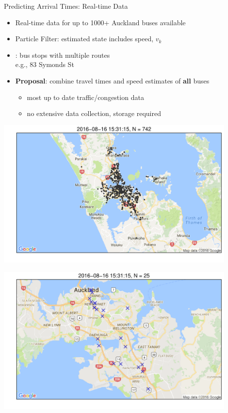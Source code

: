 \documentclass[10pt,t]{beamer}
\begin{document}
\begin{frame}{Predicting Arrival Times: Real-time Data}  
  \begin{itemize}[<+->]
  \item Real-time data for up to 1000+ Auckland buses available
  \item Particle Filter: estimated state includes speed, $v_k$
  \item \cite{yu-etal:2011}: bus stops with multiple routes\\
    e.g., 83 Symonds St
  
    \vspace{1em}
  \item \textbf{Proposal}: combine travel times and speed estimates of \textbf{all} buses
    \begin{itemize}[<1->]
    \item most up to date traffic/congestion data
    \item no extensive data collection, storage required
    \end{itemize}
  \end{itemize}

  \vspace{-5em}
  \begin{overprint}
    \centering
    \includegraphics[width=0.9\textwidth]{figs/allbuses.pdf}

    \centering
    \includegraphics[width=0.9\textwidth]{figs/symondsbuses.pdf}
  \end{overprint}
\end{frame}
\end{document}
